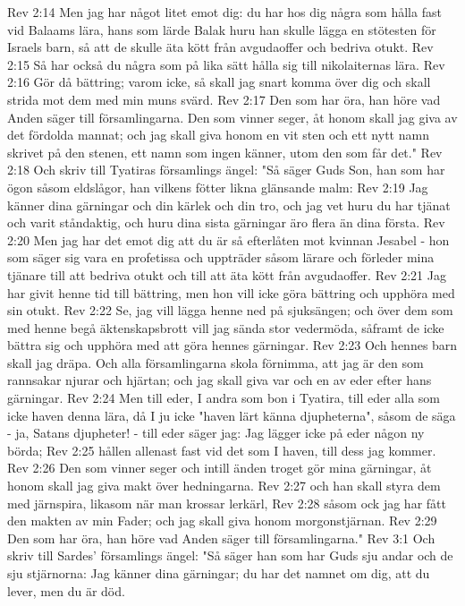 Rev 2:14  Men jag har något litet emot dig: du har hos dig några som hålla fast vid Balaams lära, hans som lärde Balak huru han skulle lägga en stötesten för Israels barn, så att de skulle äta kött från avgudaoffer och bedriva otukt.
Rev 2:15  Så har också du några som på lika sätt hålla sig till nikolaiternas lära.
Rev 2:16  Gör då bättring; varom icke, så skall jag snart komma över dig och skall strida mot dem med min muns svärd.
Rev 2:17  Den som har öra, han höre vad Anden säger till församlingarna. Den som vinner seger, åt honom skall jag giva av det fördolda mannat; och jag skall giva honom en vit sten och ett nytt namn skrivet på den stenen, ett namn som ingen känner, utom den som får det."
Rev 2:18  Och skriv till Tyatiras församlings ängel: "Så säger Guds Son, han som har ögon såsom eldslågor, han vilkens fötter likna glänsande malm:
Rev 2:19  Jag känner dina gärningar och din kärlek och din tro, och jag vet huru du har tjänat och varit ståndaktig, och huru dina sista gärningar äro flera än dina första.
Rev 2:20  Men jag har det emot dig att du är så efterlåten mot kvinnan Jesabel - hon som säger sig vara en profetissa och uppträder såsom lärare och förleder mina tjänare till att bedriva otukt och till att äta kött från avgudaoffer.
Rev 2:21  Jag har givit henne tid till bättring, men hon vill icke göra bättring och upphöra med sin otukt.
Rev 2:22  Se, jag vill lägga henne ned på sjuksängen; och över dem som med henne begå äktenskapsbrott vill jag sända stor vedermöda, såframt de icke bättra sig och upphöra med att göra hennes gärningar.
Rev 2:23  Och hennes barn skall jag dräpa. Och alla församlingarna skola förnimma, att jag är den som rannsakar njurar och hjärtan; och jag skall giva var och en av eder efter hans gärningar.
Rev 2:24  Men till eder, I andra som bon i Tyatira, till eder alla som icke haven denna lära, då I ju icke "haven lärt känna djupheterna", såsom de säga - ja, Satans djupheter! - till eder säger jag: Jag lägger icke på eder någon ny börda;
Rev 2:25  hållen allenast fast vid det som I haven, till dess jag kommer.
Rev 2:26  Den som vinner seger och intill änden troget gör mina gärningar, åt honom skall jag giva makt över hedningarna.
Rev 2:27  och han skall styra dem med järnspira, likasom när man krossar lerkärl,
Rev 2:28  såsom ock jag har fått den makten av min Fader; och jag skall giva honom morgonstjärnan.
Rev 2:29  Den som har öra, han höre vad Anden säger till församlingarna."
Rev 3:1  Och skriv till Sardes' församlings ängel: "Så säger han som har Guds sju andar och de sju stjärnorna: Jag känner dina gärningar; du har det namnet om dig, att du lever, men du är död.
